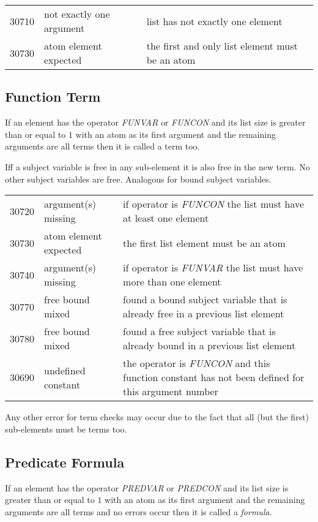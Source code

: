 \documentclass[a4paper,german,10pt,twoside]{book}
\theoremstyle{definition}
\theoremstyle{remark}
\begin{document}
\begin{tabularx}{\linewidth}{llX}
  30710  & not exactly one argument & list has not exactly one element \\
  30730  & atom element expected    & the first and only list element must be an atom 
\end{tabularx}


\subsection{Function Term
}
If an element has the operator \emph{FUNVAR} or \emph{FUNCON} and its list size is greater than or equal to $1$ with an atom as its first argument and the remaining arguments are all terms then it is called a term too.

\par
Iff a subject variable is free in any sub-element it is also free in the new term. No other subject variables are free. Analogous for bound subject variables. 


\begin{tabularx}{\linewidth}{llX}
  30720  & argument(s) missing      & if operator is \emph{FUNCON} the list must have at least one element \\
  30730  & atom element expected    & the first list element must be an atom \\ 
  30740  & argument(s) missing      & if operator is \emph{FUNVAR} the list must have more than one element \\
  30770  & free bound mixed         & found a bound subject variable that is already free in a previous list element \\
  30780  & free bound mixed         & found a free subject variable that is already bound in a previous list element \\
  30690  & undefined constant       & the operator is \emph{FUNCON} and this function constant has not been defined for this argument number
\end{tabularx}

\par
Any other error for term checks may occur due to the fact that all (but the first) sub-elements must be terms too.


\subsection{Predicate Formula
}
If an element has the operator \emph{PREDVAR} or \emph{PREDCON} and its list size is greater than or equal to $1$ with an atom as its first argument and the remaining arguments are all terms and no errors occur then it is called a \emph{formula}.
\end{document}
